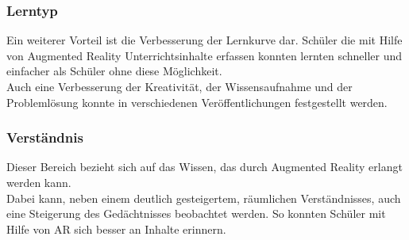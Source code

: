 \subsubsection{Lerntyp}
Ein weiterer Vorteil ist die Verbesserung der Lernkurve dar. Schüler die mit Hilfe von Augmented Reality Unterrichtsinhalte erfassen konnten lernten schneller und einfacher als Schüler ohne diese Möglichkeit.\\
Auch eine Verbesserung der Kreativität, der Wissensaufnahme und der Problemlösung konnte in verschiedenen Veröffentlichungen festgestellt werden.
\citep[Kapitel 4.4]{diegmann:benefits-ar}

\subsubsection{Verständnis}
Dieser Bereich bezieht sich auf das Wissen, das durch Augmented Reality erlangt werden kann.\\
Dabei kann, neben einem deutlich gesteigertem, räumlichen Verständnisses, auch eine Steigerung des Gedächtnisses beobachtet werden. So konnten Schüler mit Hilfe von AR sich besser an Inhalte erinnern. \\
\citep[Kapitel 4.5]{diegmann:benefits-ar}

